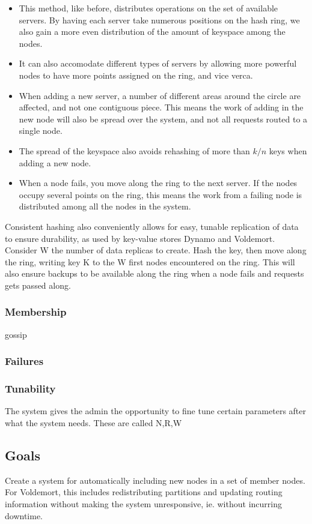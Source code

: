 \begin{itemize}
\item This method, like before, distributes operations on the set of available servers. By having each server take numerous positions on the hash ring, we also gain a more even distribution of the amount of keyspace among the nodes.

\item It can also accomodate different types of servers by allowing more powerful nodes to have more points assigned on the ring, and vice verca. 

\item When adding a new server, a number of different areas around the circle are affected, and not one contiguous piece. This means the work of adding in the new node will also be spread over the system, and not all requests routed to a single node.

\item The spread of the keyspace also avoids rehashing of more than $k/n$ keys when adding a new node. 

\item When a node fails, you move along the ring to the next server. If the nodes occupy several points on the ring, this means the work from a failing node is distributed among all the nodes in the system.
\end{itemize}

Consistent hashing also conveniently allows for easy, tunable replication of data to ensure durability, as used by key-value stores Dynamo\cite{dynamo} and Voldemort. Consider W the number of data replicas to create. Hash the key, then move along the ring, writing key K to the W first nodes encountered on the ring. This will also ensure backups to be available along the ring when a node fails and requests gets passed along.

\subsubsection{Membership}
gossip

\subsubsection{Failures}

\subsubsection{Tunability}
The system gives the admin the opportunity to fine tune certain parameters after what the system needs.
These are called N,R,W

\subsection{Goals}
Create a system for automatically including new nodes in a set of member nodes.
For Voldemort, this includes redistributing partitions and updating routing information without making the system unresponsive, ie. without incurring downtime.


